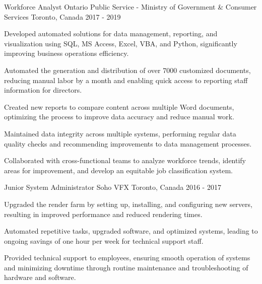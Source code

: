 \begin{cventries}
\cventry
  {Workforce Analyst}
  {Ontario Public Service - Ministry of Government \& Consumer Services}
  {Toronto, Canada}
  {2017 - 2019}
  {
    \begin{cvitems}
      \item Developed automated solutions for data management, reporting, and visualization using SQL, MS Access, Excel, VBA, and Python, significantly improving business operations efficiency.
      \item Automated the generation and distribution of over 7000 customized documents, reducing manual labor by a month and enabling quick access to reporting staff information for directors.
      \item Created new reports to compare content across multiple Word documents, optimizing the process to improve data accuracy and reduce manual work.
      \item Maintained data integrity across multiple systems, performing regular data quality checks and recommending improvements to data management processes.
      \item Collaborated with cross-functional teams to analyze workforce trends, identify areas for improvement, and develop an equitable job classification system.
    \end{cvitems}
  }

\cventry
  {Junior System Administrator}
  {Soho VFX}
  {Toronto, Canada}
  {2016 - 2017}
  {
    \begin{cvitems}
      \item Upgraded the render farm by setting up, installing, and configuring new servers, resulting in improved performance and reduced rendering times.
      \item Automated repetitive tasks, upgraded software, and optimized systems, leading to ongoing savings of one hour per week for technical support staff.
      \item Provided technical support to employees, ensuring smooth operation of systems and minimizing downtime through routine maintenance and troubleshooting of hardware and software.
    \end{cvitems}
  }


\end{cventries}

